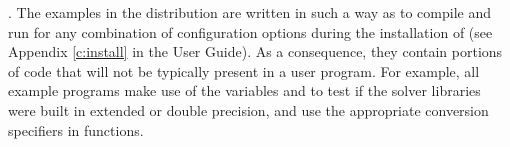 \vspace{0.2in}.
The examples in the {\cvode} distribution are written in such a way as
to compile and run for any combination of configuration options during
the installation of {\sundials} (see Appendix \ref{c:install} in the User Guide).
As a consequence, they contain portions of code that will not be typically present in a
user program. For example, all {\CC} example programs make use of the
variables  and 
to test if the solver libraries were built in extended or double precision,
and use the appropriate conversion specifiers in  functions.
